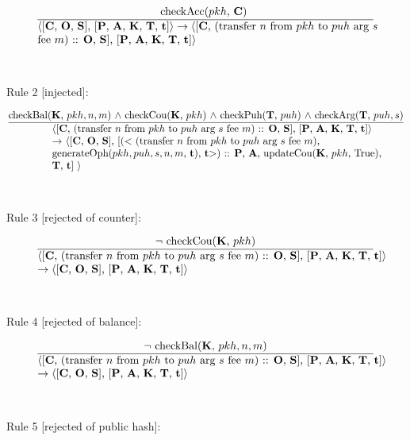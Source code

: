 \documentclass[a4paper]{llncs}
\begin{document}
\begin{equation}{}
\frac{\text{checkAcc($pkh$, \ACCOUNTS)  }}{\parbox{4.2in}{\text{$\langle$[\ACCOUNTS, \OPERATIONS, \CONTRACTS], [\PENDING, \ACCEPTED, \MANAGERS, \CONTRACTORS, \TIME]$\rangle \rightarrow \langle$[\ACCOUNTS, (transfer ${n}$ from ${pkh}$ to  ${puh}$ arg ${s}$ }  \\
\text{fee ${m}$) :: \OPERATIONS, \CONTRACTS], [\PENDING, \ACCEPTED, \MANAGERS, \CONTRACTORS, \TIME]$\rangle$}}} 
\end{equation}
~\\
~\\
Rule 2 [injected]:

\begin{equation}{}
\frac{\text{checkBal(\MANAGERS, $pkh, n, m$) $\wedge$ checkCou(\MANAGERS, $pkh$) $\wedge$ checkPuh(\CONTRACTORS, $puh$)}
\\
\text{ $\wedge$ checkArg(\CONTRACTORS, $puh, s$)}}{\parbox{4.2in}{\text{$\langle$[\ACCOUNTS, (transfer ${n}$ from ${pkh}$ to  ${puh}$ arg ${s}$ fee ${m}$) :: \OPERATIONS, \CONTRACTS], [\PENDING, \ACCEPTED, \MANAGERS, \CONTRACTORS, \TIME]$\rangle$}\\
\text{$\rightarrow$  $\langle$[\ACCOUNTS, \OPERATIONS, \CONTRACTS], [($<$ (transfer ${n}$ from ${pkh}$ to  ${puh}$ arg ${s}$ fee ${m}$), }\\
 \text{generateOph($pkh, puh, s, n, m$, \TIME), \TIME $>$) :: \PENDING, \ACCEPTED, updateCou(\MANAGERS, $pkh$, True), }\\
\text{\CONTRACTORS, \TIME] $\rangle$}}} 
\end{equation}
~\\
~\\
Rule 3 [rejected of counter]:

\begin{equation}{}
\frac{\text{$\neg$ checkCou(\MANAGERS, $pkh$)}}{\parbox{4.2in}{\text{$\langle$[\ACCOUNTS, (transfer ${n}$ from ${pkh}$ to  ${puh}$ arg ${s}$ fee ${m}$) :: \OPERATIONS, \CONTRACTS], [\PENDING, \ACCEPTED, \MANAGERS, \CONTRACTORS, \TIME]$\rangle$  }\\
\text{$\rightarrow \langle$[\ACCOUNTS, \OPERATIONS, \CONTRACTS], [\PENDING, \ACCEPTED, \MANAGERS, \CONTRACTORS, \TIME]$\rangle$}}} 
\end{equation}
~\\
~\\
Rule 4 [rejected of balance]:

\begin{equation}{}
\frac{\text{$\neg$ checkBal(\MANAGERS, $pkh, n, m$)}}{\parbox{4.2in}{\text{$\langle$[\ACCOUNTS, (transfer ${n}$ from ${pkh}$ to  ${puh}$ arg ${s}$ fee ${m}$) :: \OPERATIONS, \CONTRACTS], [\PENDING, \ACCEPTED, \MANAGERS, \CONTRACTORS, \TIME]$\rangle$ }\\
\text{$\rightarrow \langle$[\ACCOUNTS, \OPERATIONS, \CONTRACTS], [\PENDING, \ACCEPTED, \MANAGERS, \CONTRACTORS, \TIME]$\rangle$}}} 
\end{equation}
~\\
~\\
Rule 5 [rejected of public hash]:
\end{document}
